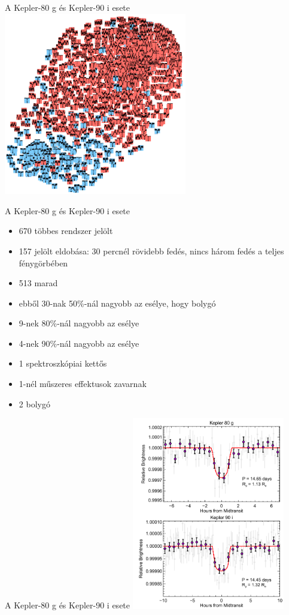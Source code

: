 \begin{frame}{A Kepler-80 g és Kepler-90 i esete}
    \centering
    \includegraphics[width=0.6\textwidth]{figures/kepler80-tsne.png}
\end{frame}

\begin{frame}{A Kepler-80 g és Kepler-90 i esete}
    \begin{itemize}
        \item 670 többes rendszer jelölt
        \item 157 jelölt eldobása: 30 percnél rövidebb fedés, nincs három fedés a teljes fénygörbében
        \item 513 marad
        \item ebből 30-nak 50\%-nál nagyobb az esélye, hogy bolygó
        \item 9-nek 80\%-nál nagyobb az esélye
        \item 4-nek 90\%-nál nagyobb az esélye
        \item 1 spektroszkópiai kettős
        \item 1-nél műszeres effektusok zavarnak
        \item 2 bolygó
    \end{itemize}
\end{frame}

\begin{frame}{A Kepler-80 g és Kepler-90 i esete}
    \centering
    \includegraphics[width=0.5\textwidth]{figures/kepler-80-90-transit.png}
\end{frame}
